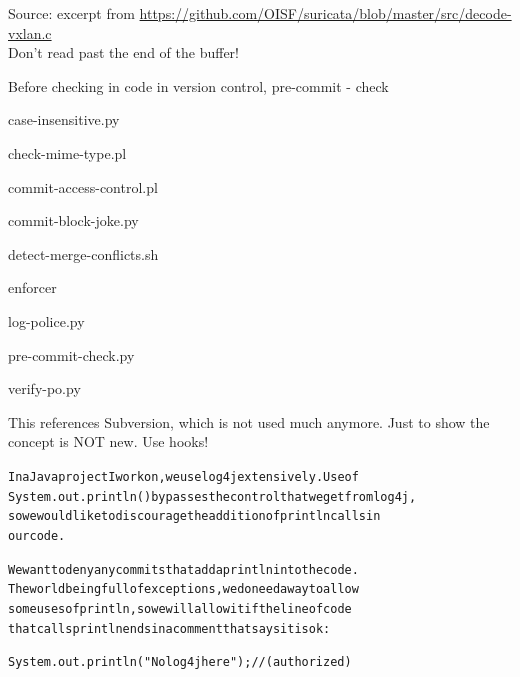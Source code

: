 \documentclass[Screen16to9,17pt]{foils}
\begin{document}
Source: excerpt from \url{https://github.com/OISF/suricata/blob/master/src/decode-vxlan.c}\\
Don't read past the end of the buffer!




\begin{list1}
\item Before checking in code in version control,  pre-commit - check
\begin{list2}
\item case-insensitive.py
\item check-mime-type.pl
\item commit-access-control.pl
\item commit-block-joke.py
\item detect-merge-conflicts.sh
\item enforcer
\item log-police.py
\item pre-commit-check.py
\item verify-po.py
\end{list2}
\item {}
\item {}
\end{list1}

This references Subversion, which is not used much anymore. Just to show the concept is NOT new. Use hooks!


\begin{alltt}
In a Java project I work on, we use log4j extensively.  Use of
System.out.println() bypasses the control that we get from log4j,
so we would like to discourage the addition of println calls in
our code.

We want to deny any commits that add a println into the code.
The world being full of exceptions, we do need a way to allow
some uses of println, so we will allow it if the line of code
that calls println ends in a comment that says it is ok:

   System.out.println("No log4j here"); // (authorized)
\end{alltt}

{\small {}}
\end{document}
